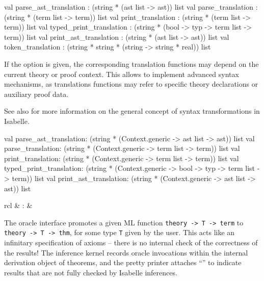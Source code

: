 \begin{isabellebody}
\begin{isamarkuptext}
\begin{ttbox}
val parse_ast_translation   : (string * (ast list -> ast)) list
val parse_translation       : (string * (term list -> term)) list
val print_translation       : (string * (term list -> term)) list
val typed_print_translation :
  (string * (bool -> typ -> term list -> term)) list
val print_ast_translation   : (string * (ast list -> ast)) list
val token_translation       :
  (string * string * (string -> string * real)) list
\end{ttbox}

  If the  option is given, the corresponding
  translation functions may depend on the current theory or proof
  context.  This allows to implement advanced syntax mechanisms, as
  translations functions may refer to specific theory declarations or
  auxiliary proof data.

  See also \cite[\S8]{isabelle-ref} for more information on the
  general concept of syntax transformations in Isabelle.

\begin{ttbox}
val parse_ast_translation:
  (string * (Context.generic -> ast list -> ast)) list
val parse_translation:
  (string * (Context.generic -> term list -> term)) list
val print_translation:
  (string * (Context.generic -> term list -> term)) list
val typed_print_translation:
  (string * (Context.generic -> bool -> typ -> term list -> term)) list
val print_ast_translation:
  (string * (Context.generic -> ast list -> ast)) list
\end{ttbox}%
\end{isamarkuptext}%
\isamarkuptrue%
%
\isamarkuptrue%
%
\begin{isamarkuptext}%
\begin{matharray}{rcl}
    \mbox{} & : &  \\
  \end{matharray}

  The oracle interface promotes a given ML function \verb|theory -> T -> term| to \verb|theory -> T -> thm|, for some
  type \verb|T| given by the user.  This acts like an infinitary
  specification of axioms -- there is no internal check of the
  correctness of the results!  The inference kernel records oracle
  invocations within the internal derivation object of theorems, and
  the pretty printer attaches ``\isa{{\isacharbrackleft}{\isacharbang}{\isacharbrackright}}'' to indicate results
  that are not fully checked by Isabelle inferences.


\end{isamarkuptext}
\end{isabellebody}
